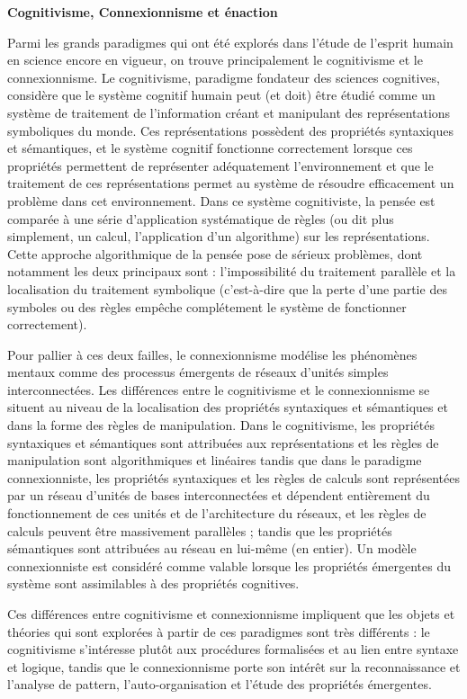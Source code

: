 \documentclass[12pt]{scrartcl}
\begin{document}
\textbf{Cognitivisme, Connexionnisme et énaction} 

Parmi les grands paradigmes qui ont été explorés dans l'étude de l'esprit humain en science encore en vigueur, on trouve principalement le cognitivisme et le connexionnisme. Le cognitivisme, paradigme fondateur des sciences cognitives, considère que le système cognitif humain peut (et doit) être étudié comme un système de traitement de l'information créant et manipulant des représentations symboliques du monde. Ces représentations possèdent des propriétés syntaxiques et sémantiques, et le système cognitif fonctionne correctement lorsque ces propriétés permettent de représenter adéquatement l'environnement et que le traitement de ces représentations permet au système de résoudre efficacement un problème dans cet environnement. Dans ce système cognitiviste, la pensée est comparée à une série d'application systématique de règles (ou dit plus simplement, un calcul, l'application d'un algorithme) sur les représentations. Cette approche algorithmique de la pensée pose de sérieux problèmes, dont notamment les deux principaux sont : l'impossibilité du traitement parallèle et la localisation du traitement symbolique (c'est-à-dire que la perte d'une partie des symboles ou des règles empêche complétement le système de fonctionner correctement). 

Pour pallier à ces deux failles, le connexionnisme modélise les phénomènes mentaux comme des processus émergents de réseaux d'unités simples interconnectées. Les différences entre le cognitivisme et le connexionnisme se situent au niveau de la localisation des propriétés syntaxiques et sémantiques et dans la forme des règles de manipulation. Dans le cognitivisme, les propriétés syntaxiques et sémantiques sont attribuées aux représentations et les règles de manipulation sont algorithmiques et linéaires tandis que dans le paradigme connexionniste, les propriétés syntaxiques et les règles de calculs sont représentées par un réseau d'unités de bases interconnectées et dépendent entièrement du fonctionnement de ces unités et de l'architecture du réseaux, et les règles de calculs peuvent être massivement parallèles ; tandis que les propriétés sémantiques sont attribuées au réseau en lui-même (en entier). Un modèle connexionniste est considéré comme valable lorsque les propriétés émergentes du système sont assimilables à des propriétés cognitives.

Ces différences entre cognitivisme et connexionnisme impliquent que les objets et théories qui sont explorées à partir de ces paradigmes sont très différents : le cognitivisme s'intéresse plutôt aux procédures formalisées et au lien entre syntaxe et logique, tandis que le connexionnisme porte son intérêt sur la reconnaissance et l'analyse de pattern, l'auto-organisation et l'étude des propriétés émergentes.\\
\end{document}
